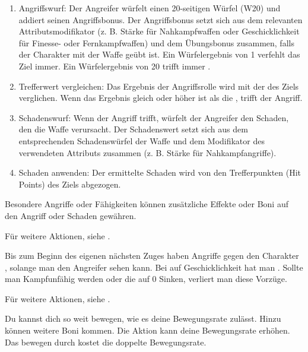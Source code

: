\begin{enumerate}

\item Angriffswurf: Der Angreifer würfelt einen 20-seitigen Würfel (W20) und addiert seinen Angriffsbonus. Der Angriffsbonus setzt sich aus dem relevanten Attributsmodifikator (z. B. Stärke für Nahkampfwaffen oder Geschicklichkeit für Finesse- oder Fernkampfwaffen) und dem Übungsbonus zusammen, falls der Charakter mit der Waffe geübt ist. Ein Würfelergebnis von 1 verfehlt das Ziel immer. Ein Würfelergebnis von 20 trifft immer .
\item Trefferwert vergleichen: Das Ergebnis der Angriffsrolle wird mit der  des Ziels verglichen. Wenn das Ergebnis gleich oder höher ist als die , trifft der Angriff.
\item Schadenswurf: Wenn der Angriff trifft, würfelt der Angreifer den Schaden, den die Waffe verursacht. Der Schadenswert setzt sich aus dem entsprechenden Schadenswürfel der Waffe und dem Modifikator des verwendeten Attributs zusammen (z. B. Stärke für Nahkampfangriffe).
\item Schaden anwenden: Der ermittelte Schaden wird von den Trefferpunkten (Hit Points) des Ziels abgezogen.
\end{enumerate}
Besondere Angriffe oder Fähigkeiten können zusätzliche Effekte oder Boni auf den Angriff oder Schaden gewähren.

Für weitere Aktionen, siehe .



Bis zum Beginn des eigenen nächsten Zuges haben Angriffe gegen den Charakter , solange man den Angreifer sehen kann. Bei  auf Geschicklichkeit hat man . Sollte man Kampfunfähig werden oder die  auf 0 Sinken, verliert man diese Vorzüge.

Für weitere Aktionen, siehe .



Du kannst dich so weit bewegen, wie es deine Bewegungsrate zulässt. Hinzu können weitere Boni kommen. Die Aktion  kann deine Bewegungsrate erhöhen. Das bewegen durch  kostet die doppelte Bewegungsrate.

